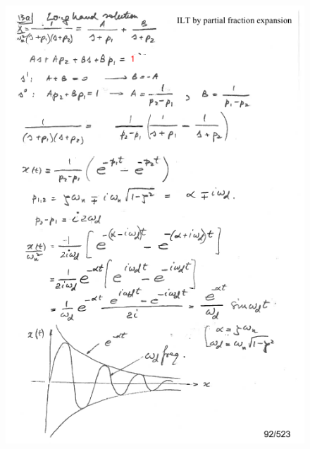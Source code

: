 \documentclass[12pt,letter]{article}
\begin{document}
\begin{mdframed}[middlelinewidth=0.5mm]
	\begin{center}
	\end{center}
	
	\begin{figure}[H]
		\centering
		\includegraphics[width=5.5in]{../figures/x_t_time_response_2nd_order_impulse_proof_1}
	\end{figure}
	\begin{figure}[H]
		\centering

\end{figure}
\end{mdframed}
\end{document}
